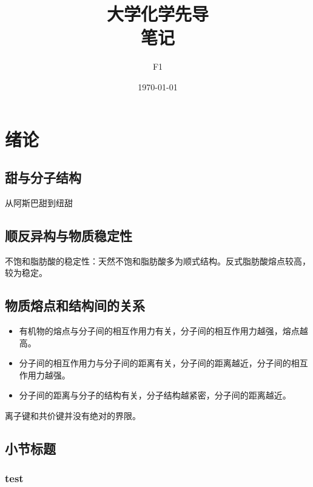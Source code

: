 \documentclass[12pt, a4paper, oneside]{ctexbook}
\title{{\Huge{\textbf{大学化学先导}}}\\笔记}
\author{F1}
\date{\today}
\begin{document}
\maketitle

\setcounter{page}{1}



{}
\setcounter{page}{1}
\tableofcontents
\newpage
\setcounter{page}{1}

\chapter{绪论}

\section{甜与分子结构}
从阿斯巴甜到纽甜

\section{顺反异构与物质稳定性}
不饱和脂肪酸的稳定性：天然不饱和脂肪酸多为顺式结构。反式脂肪酸熔点较高，较为稳定。

\section{物质熔点和结构间的关系}
\begin{itemize}
    \item 有机物的熔点与分子间的相互作用力有关，分子间的相互作用力越强，熔点越高。
    \item 分子间的相互作用力与分子间的距离有关，分子间的距离越近，分子间的相互作用力越强。
    \item 分子间的距离与分子的结构有关，分子结构越紧密，分子间的距离越近。
\end{itemize}
离子键和共价键并没有绝对的界限。




\section{小节标题}

 
\subsection{test}
\end{document}
